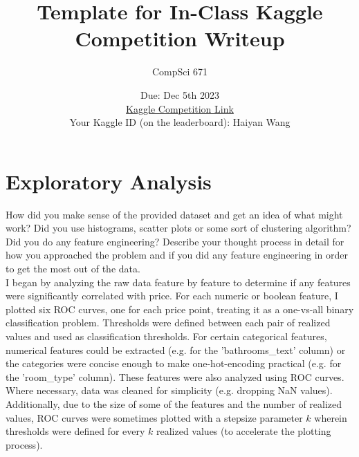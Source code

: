 \documentclass[12pt]{article}
\title{Template for In-Class Kaggle Competition Writeup \\}
\author{CompSci 671}
\date{Due: Dec 5th 2023\\
\href{https://www.kaggle.com/t/1850243e43cf4b969adeec5069f2f0eb}{Kaggle Competition Link}\\
Your Kaggle ID (on the leaderboard): Haiyan Wang
}
\newtheorem{Proof of Lemma}{Proof of Lemma}
\begin{document}
\maketitle


\section{Exploratory Analysis}
How did you make sense of the provided dataset and get an idea of what might work? Did you use histograms, scatter plots or some sort of clustering algorithm? Did you do any feature engineering? Describe your thought process in detail for how you approached the problem and if you did any feature engineering in order to get the most out of the data. \\

I began by analyzing the raw data feature by feature to determine if any features were significantly correlated with price. For each numeric or boolean feature, I plotted six ROC curves, one for each price point, treating it as a one-vs-all binary classification problem. Thresholds were defined between each pair of realized values and used as classification thresholds. For certain categorical features, numerical features could be extracted (e.g. for the 'bathrooms\_text' column) or the categories were concise enough to make one-hot-encoding practical (e.g. for the 'room\_type' column). These features were also analyzed using ROC curves. Where necessary, data was cleaned for simplicity (e.g. dropping NaN values). Additionally, due to the size of some of the features and the number of realized values, ROC curves were sometimes plotted with a stepsize parameter $k$ wherein thresholds were defined for every $k$ realized values (to accelerate the plotting process). \\
\end{document}
